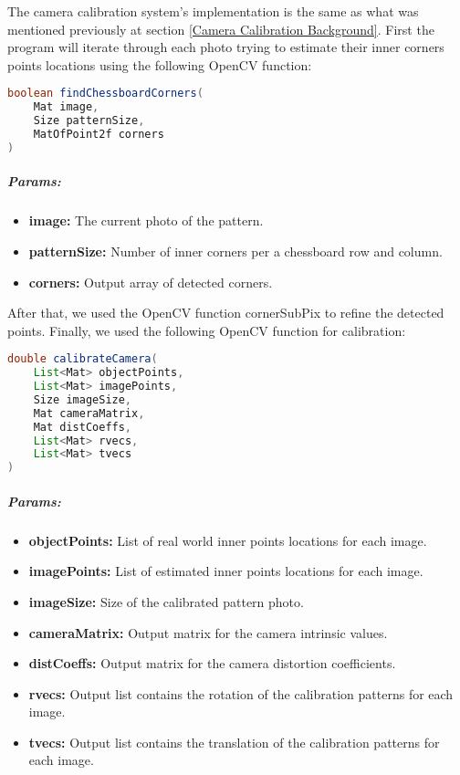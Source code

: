 The camera calibration system's implementation is the same as what was mentioned previously at section \ref{Camera Calibration Background}. First the program will iterate through each photo trying to estimate their inner corners points locations using the following OpenCV function:
\begin{lstlisting}[language=Java]
boolean findChessboardCorners(
	Mat image,
	Size patternSize,
	MatOfPoint2f corners
)
\end{lstlisting}

\subparagraph{Params:}

\begin{itemize}
	\item \textbf{image:}
	The current photo of the pattern.
	\item \textbf{patternSize:}
	Number of inner corners per a chessboard row and column.
	\item \textbf{corners:}
	Output array of detected corners.
\end{itemize}

After that, we used the OpenCV function cornerSubPix to refine the detected points. Finally, we used the following OpenCV function for calibration:
\begin{lstlisting}[language=Java]
double calibrateCamera(
	List<Mat> objectPoints,
	List<Mat> imagePoints, 
	Size imageSize, 
	Mat cameraMatrix, 
	Mat distCoeffs, 
	List<Mat> rvecs, 
	List<Mat> tvecs
)
\end{lstlisting}

\subparagraph{Params:}

\begin{itemize}
	\item \textbf{objectPoints:}
	List of real world inner points locations for each image.
	\item \textbf{imagePoints:}
	List of estimated inner points locations for each image.
	\item \textbf{imageSize:}
	Size of the calibrated pattern photo.
	\item \textbf{cameraMatrix:}
	Output matrix for the camera intrinsic values.
	\item \textbf{distCoeffs:}
	Output matrix for the camera distortion coefficients.
	\item \textbf{rvecs:}
	Output list contains the rotation of the calibration patterns for each image.
	\item \textbf{tvecs:}
	Output list contains the translation of the calibration patterns for each image.
\end{itemize}

